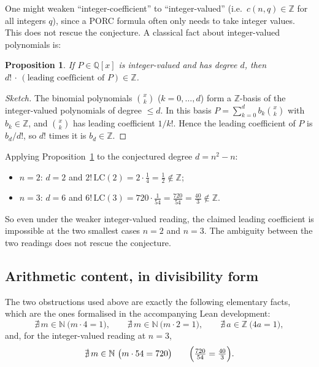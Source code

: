 \documentclass[11pt]{article}
\newtheorem{proposition}{Proposition}
\theoremstyle{remark}
\newcommand{\LC}{\mathrm{LC}}
\begin{document}
One might weaken ``integer-coefficient'' to ``integer-valued'' (i.e.\
$c(n,q)\in\mathbb{Z}$ for all integers $q$), since a PORC formula often only
needs to take integer values. This does not rescue the conjecture. A classical
fact about integer-valued polynomials is:

\begin{proposition}\label{prop:fact}
If $P\in\mathbb{Q}[x]$ is integer-valued and has degree $d$, then
$d!\,\cdot\,(\text{leading coefficient of }P)\in\mathbb{Z}$.
\end{proposition}

\begin{proof}[Sketch]
The binomial polynomials $\binom{x}{k}$ ($k=0,\dots,d$) form a $\mathbb{Z}$-basis
of the integer-valued polynomials of degree $\le d$. In this basis
$P=\sum_{k=0}^d b_k\binom{x}{k}$ with $b_k\in\mathbb{Z}$, and
$\binom{x}{k}$ has leading coefficient $1/k!$. Hence the leading coefficient of
$P$ is $b_d/d!$, so $d!$ times it is $b_d\in\mathbb{Z}$.
\end{proof}

Applying Proposition~\ref{prop:fact} to the conjectured degree $d=n^2-n$:
\begin{itemize}
  \item $n=2$: $d=2$ and
    $\displaystyle 2!\,\LC(2)=2\cdot\frac14=\frac12\notin\mathbb{Z}$;
  \item $n=3$: $d=6$ and
    $\displaystyle 6!\,\LC(3)=720\cdot\frac{1}{54}=\frac{720}{54}=\frac{40}{3}\notin\mathbb{Z}$.
\end{itemize}
So even under the weaker integer-valued reading, the claimed leading coefficient
is impossible at the two smallest cases $n=2$ and $n=3$. The ambiguity between
the two readings does not rescue the conjecture.

\subsection{Arithmetic content, in divisibility form}

The two obstructions used above are exactly the following elementary facts,
which are the ones formalised in the accompanying Lean development:
\[
\nexists\, m\in\mathbb{N}\ \bigl(m\cdot 4 = 1\bigr),\qquad
\nexists\, m\in\mathbb{N}\ \bigl(m\cdot 2 = 1\bigr),\qquad
\nexists\, a\in\mathbb{Z}\ \bigl(4a=1\bigr),
\]
and, for the integer-valued reading at $n=3$,
\[
\nexists\, m\in\mathbb{N}\ \bigl(m\cdot 54=720\bigr)
\qquad\Bigl(\tfrac{720}{54}=\tfrac{40}{3}\Bigr).
\]
\end{document}
